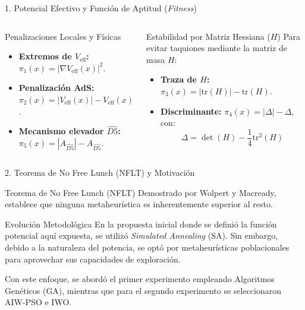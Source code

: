 \documentclass[10pt, aspectratio=169]{beamer}
\begin{document}
\begin{frame}{1. Potencial Efectivo y Función de Aptitud (\textit{Fitness})}
  \begin{columns}
    \begin{block}{Penalizaciones Locales y Físicas}
      \begin{itemize}
        \item \textbf{Extremos de \(V_{\text{eff}}\):} \(\pi_1(x) = |\nabla V_{\text{eff}}(x)|^2\).
        \item \textbf{Penalización AdS:} \(\pi_2(x) = |V_{\text{eff}}(x)| - V_{\text{eff}}(x)\).
        \item \textbf{Mecanismo elevador \(\widehat{D5}\):} \(\pi_5(x) = |A_{\widehat{D5}}| - A_{\widehat{D5}}\).
      \end{itemize}
    \end{block}

    \begin{alertblock}{Estabilidad por Matriz Hessiana (\(H\))}
      Para evitar taquiones mediante la matriz de masa \(H\):
      \begin{itemize}
        \item \textbf{Traza de \(H\):} \(\pi_3(x) = |\text{tr}(H)| - \text{tr}(H)\).
        \item \textbf{Discriminante:} \(\pi_4(x) = |\Delta| - \Delta\), con:
        \begin{equation*}
          \Delta = \det(H) - \frac{1}{4}\text{tr}^2(H)
        \end{equation*}
      \end{itemize}
    \end{alertblock}
  \end{columns}
\end{frame}

\begin{frame}{2. Teorema de No Free Lunch (NFLT) y Motivación}
  \begin{block}{Teorema de No Free Lunch (NFLT)}
    Demostrado por Wolpert y Macready, establece que ninguna metaheurística es inherentemente superior al resto.
  \end{block}

  \vspace{0.3cm}

  \begin{block}{Evolución Metodológica}
    En la propuesta inicial donde se definió la función potencial aquí expuesta, se utilizó \textit{Simulated Annealing} (SA).
    Sin embargo, debido a la naturaleza del potencia, se optó por metaheurísticas poblacionales para aprovechar sus capacidades
    de exploración.

    \vspace{0.2cm}

    Con este enfoque, se abordó el primer experimento empleando Algoritmos Genéticos (GA), mientras que para el segundo
    experimento se seleccionaron AIW-PSO e IWO.
  \end{block}
\end{frame}
\end{document}
